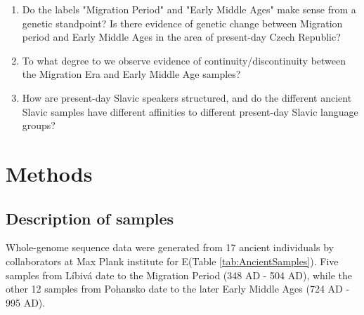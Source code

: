 \begin{enumerate}
\item Do the labels "Migration Period" and "Early Middle Ages" make sense from a genetic standpoint? Is there evidence of genetic change between Migration period and Early Middle Ages in the area of present-day Czech Republic? 
\item To what degree to we observe evidence of continuity/discontinuity between the Migration Era and Early Middle Age samples?
\item How are present-day Slavic speakers structured, and do the different ancient Slavic samples have different affinities to different present-day Slavic language groups?
\end{enumerate}


\section{Methods}

\subsection{Description of samples}

Whole-genome sequence data were generated from 17 ancient individuals by collaborators at Max Plank institute for E(Table \ref{tab:AncientSamples}). Five samples from Líbivá date to the Migration Period (348 AD - 504 AD), while the other 12 samples from Pohansko date to the later Early Middle Ages (724 AD - 995 AD).

